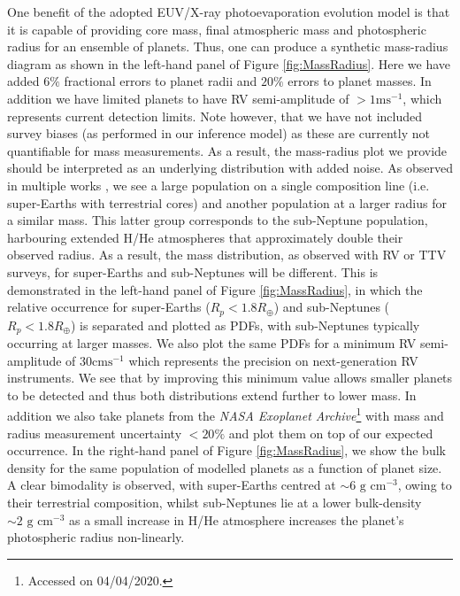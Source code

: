 \documentclass[fleqn,usenatbib]{mnras}
\begin{document}
One benefit of the adopted EUV/X-ray photoevaporation evolution model is that it is capable of providing core mass, final atmospheric mass and photospheric radius for an ensemble of planets. Thus, one can produce a synthetic mass-radius diagram as shown in the left-hand panel of Figure \ref{fig:MassRadius}. Here we have added $6\%$ fractional errors to planet radii and $20\%$ errors to planet masses. In addition we have limited planets to have RV semi-amplitude of $>1\text{ms}^{-1}$, which represents current detection limits. Note however, that we have not included survey biases (as performed in our inference model) as these are currently not quantifiable for mass measurements. As a result, the mass-radius plot we provide should be interpreted as an underlying distribution with added noise. As observed in multiple works \citep[e.g.][]{Weiss2014,Marcy2014,HaddenLithwick2014,Dressing2015,JontofHutter2016,Dorn2019}, we see a large population on a single composition line (i.e. super-Earths with terrestrial cores) and another population at a larger radius for a similar mass. This latter group corresponds to the sub-Neptune population, harbouring extended H/He atmospheres that approximately double their observed radius. As a result, the mass distribution, as observed with RV or TTV surveys, for super-Earths and sub-Neptunes will be different. This is demonstrated in the left-hand panel of Figure \ref{fig:MassRadius}, in which the relative occurrence for super-Earths ($R_p < 1.8 R_\oplus$) and sub-Neptunes ($R_p < 1.8 R_\oplus$) is separated and plotted as PDFs, with sub-Neptunes typically occurring at larger masses. We also plot the same PDFs for a minimum RV semi-amplitude of $30\text{cms}^{-1}$ which represents the precision on next-generation RV instruments. We see that by improving this minimum value allows smaller planets to be detected and thus both distributions extend further to lower mass. In addition we also take planets from the \textit{NASA Exoplanet Archive}\footnote{Accessed on 04/04/2020.} with mass and radius measurement uncertainty $<20\%$ and plot them on top of our expected occurrence. In the right-hand panel of Figure \ref{fig:MassRadius}, we show the bulk density for the same population of modelled planets as a function of planet size. A clear bimodality is observed, with super-Earths centred at $\sim 6\text{ g cm}^{-3}$, owing to their terrestrial composition, whilst sub-Neptunes lie at a lower bulk-density $\sim 2\text{ g cm}^{-3}$ as a small increase in H/He atmosphere increases the planet's photospheric radius non-linearly. 
\end{document}
